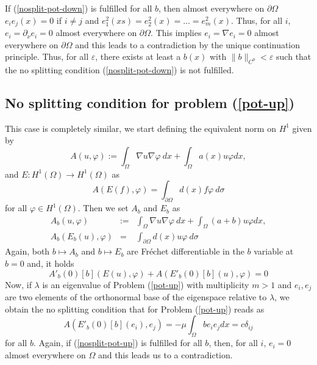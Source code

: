 \documentclass[a4paper,reqno,11pt,oneside]{amsart}
\theoremstyle{plain}
\theoremstyle{plain}
\theoremstyle{plain}
\theoremstyle{remark}
\begin{document}
If (\ref{nosplit-pot-down}) is fulfilled for all $b$, then almost everywhere on $\partial \Omega$ $e_i e_j(x)=0$ if $i\neq j$ and $e_1^2(xs)=e_2^2(x)=\dots=e_m^2(x)$. Thus, for all $i$,  $e_i=\partial_\nu e_i=0$ almost everywhere on $\partial \Omega$. This implies $e_i=\nabla e_i=0$  almost everywhere on $\partial \Omega$ and this leads to a contradiction by the unique continuation principle. 
Thus, for all $\varepsilon$, there exists at least a $b(x)$ with $\|b\|_{C^0}<\varepsilon$ such that the no splitting condition  (\ref{nosplit-pot-down}) is not fulfilled. 
\subsection{No splitting condition for problem (\ref{pot-up})}

This case is completely similar, we start defining the equivalent norm on $H^1$ given by 
\begin{equation}
    \label{defApot-d}
{A} (u,\varphi) :=\int_{\Omega} \nabla u \nabla  \varphi \ dx +\int_{\Omega } a(x) u\varphi dx,   
\end{equation}
and $E:H^1(\Omega)\rightarrow H^1(\Omega)$ as
\begin{equation}\label{eq:Eusimp-up}
 {A} (E(f),\varphi)=\int_{\partial \Omega} d(x)f\varphi\  d\sigma 
\end{equation}
for all $\varphi \in H^1 (\Omega)$. Then we set ${A}_b $  and $E_b$ as
\begin{eqnarray}
    {A}_b(u,\varphi) &:=&\int_{\Omega} \nabla u \nabla  \varphi \ dx +\int_{ \Omega} (a+b)u\varphi dx,   \\
    {A}_b (E_b(u),\varphi)&=&\int_{\partial \Omega} d(x)u\varphi\  d\sigma 
\end{eqnarray}
Again, both $b\mapsto {A}_b$ and $b\mapsto E_b$ are Fr\'echet differentiable in the $b$ variable at $b=0$ and, it holds
\begin{equation}
 {A'}_b(0)[b] (E(u),\varphi)+{A} (E'_b(0)[b](u),\varphi)=0 
\end{equation}
Now, if $\lambda$ is an eigenvalue of Problem (\ref{pot-up}) with multiplicity $m>1$ and $e_i,e_j$ are two elements of the orthonormal base of the eigenspace relative to $\lambda$, we obtain the no splitting condition that for Problem (\ref{pot-up}) reads as
\begin{equation}\label{nosplit-pot-up}
    {A} (E'_b(0)[b](e_i),e_j)=-\mu \int_{ \Omega}be_ie_jdx =c\delta_{ij} 
\end{equation}
for all $b$. 
Again, if (\ref{nosplit-pot-up}) is fulfilled for all $b$, then, for all $i$, $e_i=0$ almost everywhere on $\Omega$ and this leads us to a contradiction.
\end{document}
